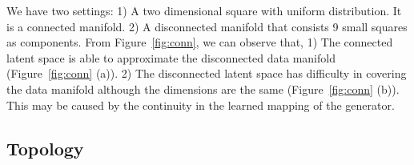 We have two settings:
1) A two dimensional square with uniform distribution.
It is a connected manifold.
2) A disconnected manifold that consists 9 small squares as components.
From Figure~\ref{fig:conn},
we can observe that,
1) The connected latent space is able to approximate the disconnected
data manifold (Figure~\ref{fig:conn} (a)).
2) The disconnected latent space has difficulty in covering
the data manifold although the dimensions are the same
(Figure~\ref{fig:conn} (b)).
This may be caused by the continuity in the learned mapping
of the generator.

\subsection{Topology}
